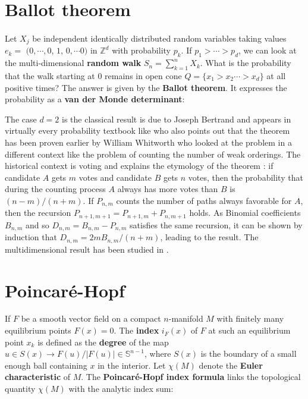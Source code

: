 \documentclass[12pt]{amsart}
\def\satz#1{ \vspace{2mm} \begin{center} \fcolorbox{yellow1}{yellow1}{ \parbox{14.0cm}{{\bf Theorem:} #1}} \vspace{2mm} \end{center} }
\begin{document}
\section{Ballot theorem}

\paragraph{}
Let $X_j$ be independent identically distributed random variables taking values
$e_k=$ $(0,\cdots,0$, $1$, $0,\cdots 0)$ in $\mathbb{Z}^d$ with probability $p_k$.
If $p_1 > \cdots > p_d$, we can look at the multi-dimensional {\bf random walk} 
$S_n = \sum_{k=1}^n X_k$. What is the probability that the walk starting at $0$
remains in open cone $Q=\{ x_1>x_2 \cdots > x_d \}$ at all positive times? The answer is
given by the {\bf Ballot theorem}. It expresses the probability as a
{\bf van der Monde determinant}:

\satz{ ${\rm P}[ S_n \in Q, \forall n>0 ] = \prod_{i<j} (p_i-p_j)$. }

The case $d=2$ is the classical result is due to Joseph Bertrand
\cite{Bertrand1887} and appears in virtually every probability textbook like
\cite{Feller} who also points out that the theorem has been proven earlier by
William Whitworth \cite{Whitworth1886} who looked at the problem in a different context like
the problem of counting the number of weak orderings. 
The historical context is voting and explains the etymology of the theorem \cite{AddarioBerryReed}:
if candidate $A$ gets $m$ votes and candidate $B$ gets $n$ votes,
then the probability that during the counting process $A$ always has more votes than
$B$ is $(n-m)/(n+m)$. If $P_{n,m}$ counts the number of paths always favorable for $A$, then
the recursion $P_{n+1,m+1}=P_{n+1,m} + P_{n,m+1}$ holds. As
Binomial coefficients $B_{n,m}$ and so $D_{n,m}=B_{n,m}-P_{n,m}$ satisfies the same
recursion, it can be shown by induction that $D_{n,m} = 2m B_{n,m}/(n+m)$, leading to the result.
The multidimensional result has been studied in \cite{Zeilberger1983,GesselZeilberger1992}.

\section{Poincar\'e-Hopf}

If $F$ be a smooth vector field on a compact $n$-manifold $M$ with
finitely many equilibrium points $F(x)=0$. The {\bf index} $i_F(x)$ of $F$ at
such an equilibrium point $x_k$ is defined as the {\bf degree} of the map
$u \in S(x) \to  F(u)/|F(u)| \in \mathbb{S}^{n-1}$, where
$S(x)$ is the boundary of a small enough ball containing $x$ in the interior.
Let $\chi(M)$ denote the {\bf Euler characteristic} of $M$.
The {\bf Poincar\'e-Hopf index formula} links the topological quantity
$\chi(M)$ with the analytic index sum:
\end{document}

